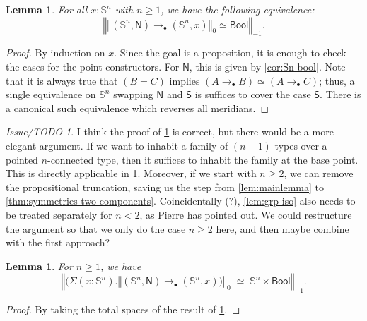 \documentclass[11pt,a4paper,oneside,reqno]{amsart}
\newtheorem{lemma}[theorem]{Lemma}
\theoremstyle{definition}
\theoremstyle{remark}
\newtheorem{issue}[theorem]{Issue/TODO}
\newcommand{\sph}[1]{{\mathbb S}^{#1}}
\newcommand{\trunc}[2]{\mathopen{}\left\Vert #2\right\Vert_{#1}\mathclose{}}
\newcommand{\North}{\mathsf N}
\newcommand{\South}{\mathsf S}
\begin{document}
\begin{lemma} \label{lem:eqv-to-bool}
 For all $x : \sph n$ with $n \geq 1$, we have the following equivalence:
 \begin{equation}
  \trunc {-1} {\trunc 0 {(\sph n, \North) \to_\bullet (\sph n, x)} \simeq \mathsf{Bool}}.
 \end{equation}
\end{lemma}
\begin{proof}
 By induction on $x$.
 Since the goal is a proposition, it is enough to check the cases for the point constructors. For $\North$, this is given by 
 \cref{cor:Sn-bool}. Note that it is always true that $(B = C)$ implies $(A \to_\bullet B) \simeq (A \to_\bullet C)$;
 thus, a single equivalence on $\sph n$ swapping $\North$ and $\South$ is suffices to cover the case $\South$.
 There is a canonical such equivalence which reverses all meridians.
\end{proof}


\begin{issue}
 I think the proof of \cref{lem:eqv-to-bool} is correct, but there would be a more elegant argument.
 If we want to inhabit a family of $(n-1)$-types over a pointed $n$-connected type, then it suffices to inhabit the family at the base point. This is directly applicable in \cref{lem:eqv-to-bool}. Moreover, if we start with $n \geq 2$, we can remove the propositional truncation, saving us the step from \cref{lem:mainlemma} to \cref{thm:symmetries-two-components}.
 Coincidentally (?), \cref{lem:grp-iso} also needs to be treated separately for $n < 2$, as Pierre has pointed out.
 We could restructure the argument so that we only do the case $n \geq 2$ here, and then maybe combine with the first approach?
\end{issue}


\begin{lemma} \label{lem:sn-bool}
 For $n \geq 1$, we have
 \begin{equation}
  \trunc {-1} {\big(\Sigma (x : \sph n). \trunc 0 {(\sph n , \North) \to_\bullet (\sph n, x)\big)} \; \simeq \; \sph n \times \mathsf{Bool}}.
 \end{equation}
\end{lemma}
\begin{proof}
 By taking the total spaces of the result of \cref{lem:eqv-to-bool}.
\end{proof}
\end{document}
